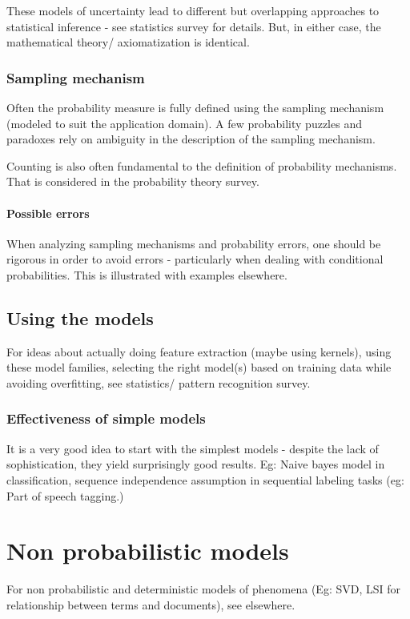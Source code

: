 \documentclass[oneside, article]{memoir}
\begin{document}
These models of uncertainty lead to different but overlapping approaches to statistical inference - see statistics survey for details. But, in either case, the mathematical theory/ axiomatization is identical.

\subsection{Sampling mechanism}
Often the probability measure is fully defined using the sampling mechanism (modeled to suit the application domain). A few probability puzzles and paradoxes rely on ambiguity in the description of the sampling mechanism.

Counting is also often fundamental to the definition of probability mechanisms. That is considered in the probability theory survey.

\subsubsection{Possible errors}
When analyzing sampling mechanisms and probability errors, one should be rigorous in order to avoid errors - particularly when dealing with conditional probabilities. This is illustrated with examples elsewhere.

\section{Using the models}
For ideas about actually doing feature extraction (maybe using kernels), using these model families, selecting the right model(s) based on training data while avoiding overfitting, see statistics/ pattern recognition survey.

\subsection{Effectiveness of simple models}
It is a very good idea to start with the simplest models - despite the lack of sophistication, they yield surprisingly good results. Eg: Naive bayes model in classification, sequence independence assumption in sequential labeling tasks (eg: Part of speech tagging.)

\chapter{Non probabilistic models}
For non probabilistic and deterministic models of phenomena (Eg: SVD, LSI for relationship between terms and documents), see elsewhere.
\end{document}
